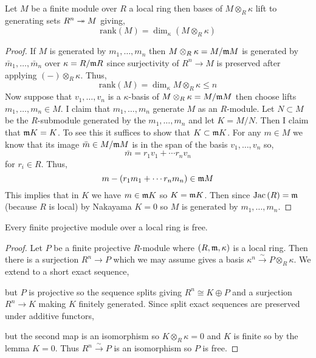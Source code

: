 \documentclass[12pt]{article}
\begin{document}
\begin{lemma}
Let $M$ be a finite module over $R$ a local ring then bases of $M \otimes_R \kappa$ lift to generating sets $R^n \twoheadrightarrow M$ giving,
\[ \mathrm{rank}(M) = \dim_{\kappa}{(M \otimes_R \kappa)} \]
\end{lemma}

\begin{proof}
If $M$ is generated by $m_1, \dots, m_n$ then $M \otimes_R \kappa = M / \mathfrak{m} M$ is generated by $\bar{m}_1, \dots, \bar{m}_n$ over $\kappa = R / \mathfrak{m} R$ since surjectivity of $R^n \to M$ is preserved after applying $(-) \otimes_R \kappa$. Thus,
\[ \mathrm{rank}(M) = \dim_{\kappa} M \otimes_{R} \kappa \le n \]
Now suppose that $v_1, \dots, v_n$ is a $\kappa$-basis of $M \otimes_{R} \kappa = M / \mathfrak{m} M$ then choose lifts $m_1, \dots, m_n \in M$. I claim that $m_1, \dots, m_n$ generate $M$ as an $R$-module. Let $N \subset M$ be the $R$-submodule generated by the $m_1, \dots, m_n$ and let $K = M / N$. Then I claim that $\mathfrak{m} K = K$. To see this it suffices to show that $K \subset \mathfrak{m} K$. For any $m \in M$ we know that its image $\bar{m} \in M / \mathfrak{m} M$ is in the span of the basis $v_1, \dots, v_n$ so,
\[ \bar{m} = r_1 v_1 + \cdots r_n v_n \]
for $r_i \in R$. Thus,
\[ m - (r_1 m_1 + \cdots r_n m_n) \in \mathfrak{m} M \]
This implies that in $K$ we have $m \in \mathfrak{m} K$ so $K = \mathfrak{m} K$. Then since $\mathrm{Jac}\left( R \right) = \mathfrak{m}$ (because $R$ is local) by Nakayama $K = 0$ so $M$ is generated by $m_1, \dots, m_n$. 
\end{proof}

\begin{theorem}
Every finite projective module over a local ring is free.
\end{theorem}

\begin{proof}
Let $P$ be a finite projective $R$-module where $(R, \mathfrak{m}, \kappa)$ is a local ring. Then there is a surjection $R^n \to P$ which we may assume gives a basis $\kappa^n \xrightarrow{\sim} P \otimes_R \kappa$. We extend to a short exact sequence,
\begin{center}
\end{center}
but $P$ is projective so the sequence splits giving $R^n \cong K \oplus P$ and a surjection $R^n \to K$ making $K$ finitely generated. Since split exact sequences are preserved under additive functors,
\begin{center}
\end{center}
but the second map is an isomorphism so $K \otimes_R \kappa = 0$ and $K$ is finite so by the lemma $K = 0$. Thus $R^n \xrightarrow{\sim} P$ is an isomorphism so $P$ is free.
\end{proof}
\end{document}
